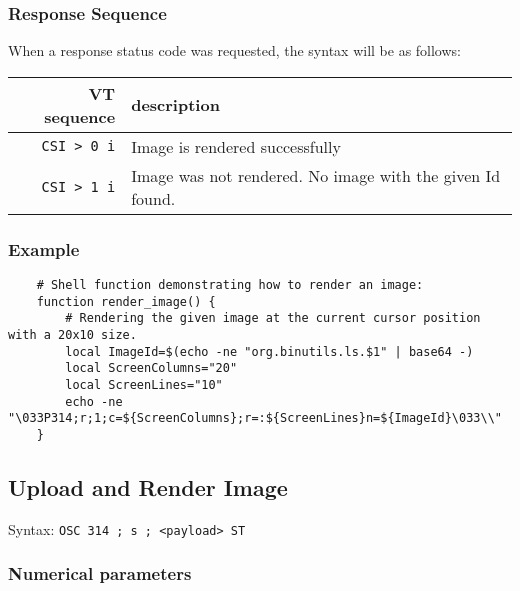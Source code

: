 \documentclass[a4paper]{article}
\newcommand{\code}[1]{\colorbox{light-gray}{\texttt{#1}}}
\begin{document}
\subsubsection*{Response Sequence}

When a response status code was requested, the syntax will be as follows:

\begin{tabular}{ |r|l| }
    \hline
    \textbf{VT sequence} & \textbf{description} \\
    \hline
    \code{CSI > 0 i} & Image is rendered successfully \\
    \code{CSI > 1 i} & Image was not rendered. No image with the given Id found. \\
    \hline
\end{tabular}

\subsubsection*{Example}

\begin{verbatim}
    # Shell function demonstrating how to render an image:
    function render_image() {
        # Rendering the given image at the current cursor position with a 20x10 size.
        local ImageId=$(echo -ne "org.binutils.ls.$1" | base64 -)
        local ScreenColumns="20"
        local ScreenLines="10"
        echo -ne "\033P314;r;1;c=${ScreenColumns};r=:${ScreenLines}n=${ImageId}\033\\"
    }
\end{verbatim}

\subsection{Upload and Render Image} %

Syntax: \code{OSC 314 ; s ; <payload> ST}

\subsubsection*{Numerical parameters}
\end{document}
